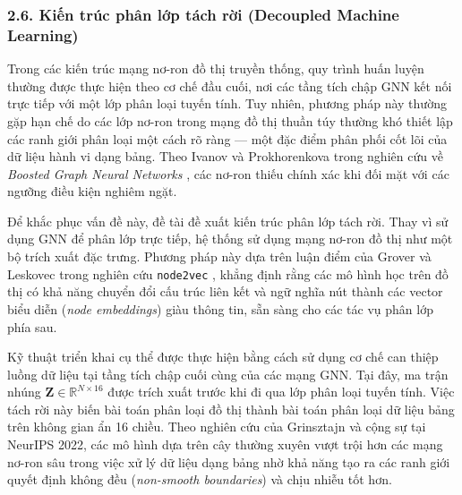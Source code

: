 \subsubsection{2.6. Kiến trúc phân lớp tách rời (Decoupled Machine Learning)}
\indent\indent Trong các kiến trúc mạng nơ-ron đồ thị truyền thống, quy trình huấn luyện thường được thực hiện theo cơ chế đầu cuối, nơi các tầng tích chập GNN kết nối trực tiếp với một lớp phân loại tuyến tính. Tuy nhiên, phương pháp này thường gặp hạn chế do các lớp nơ-ron trong mạng đồ thị thuần túy thường khó thiết lập các ranh giới phân loại một cách rõ ràng — một đặc điểm phân phối cốt lõi của dữ liệu hành vi dạng bảng. Theo Ivanov và Prokhorenkova trong nghiên cứu về \textit{Boosted Graph Neural Networks} \cite{ivanov2021boosted}, các nơ-ron thiếu chính xác khi đối mặt với các ngưỡng điều kiện nghiêm ngặt.\vspace{0.3cm}

Để khắc phục vấn đề này, đề tài đề xuất kiến trúc phân lớp tách rời. Thay vì sử dụng GNN để phân lớp trực tiếp, hệ thống sử dụng mạng nơ-ron đồ thị như một bộ trích xuất đặc trưng. Phương pháp này dựa trên luận điểm của Grover và Leskovec trong nghiên cứu \texttt{node2vec} \cite{grover2016node2vec}, khẳng định rằng các mô hình học trên đồ thị có khả năng chuyển đổi cấu trúc liên kết và ngữ nghĩa nút thành các vector biểu diễn (\textit{node embeddings}) giàu thông tin, sẵn sàng cho các tác vụ phân lớp phía sau.\vspace{0.3cm}

Kỹ thuật triển khai cụ thể được thực hiện bằng cách sử dụng cơ chế can thiệp luồng dữ liệu tại tầng tích chập cuối cùng của các mạng GNN. Tại đây, ma trận nhúng $\mathbf{Z} \in \mathbb{R}^{N \times 16}$ được trích xuất trước khi đi qua lớp phân loại tuyến tính. Việc tách rời này biến bài toán phân loại đồ thị thành bài toán phân loại dữ liệu bảng trên không gian ẩn 16 chiều. Theo nghiên cứu của Grinsztajn và cộng sự \cite{grinsztajn2022tree} tại NeurIPS 2022, các mô hình dựa trên cây thường xuyên vượt trội hơn các mạng nơ-ron sâu trong việc xử lý dữ liệu dạng bảng nhờ khả năng tạo ra các ranh giới quyết định không đều (\textit{non-smooth boundaries}) và chịu nhiễu tốt hơn.\vspace{0.3cm}

